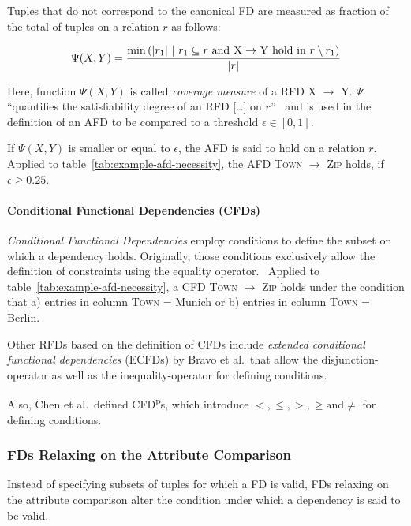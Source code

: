 Tuples that do not correspond to the canonical FD are measured as fraction of the total of tuples on a relation \( r \) as follows:

\begin{align}
    \Psi(X, Y) = \frac{\min{\left(|r_1|~|~r_1 \subseteq r \text{ and } \textsc{X} \rightarrow \textsc{Y} \text{ hold in } r \setminus r_1 \right)}}{|r|}
\end{align}

Here, function \( \Psi(X, Y) \) is called \emph{coverage measure} of a RFD \textsc{X} \( \to \) \textsc{Y}.
\( \Psi \) ``quantifies the satisfiability degree of an RFD [\dots] on \( r \)''~\cite[p.~150]{CAR16} and is used in the definition of an AFD to be compared to a threshold \( \epsilon \in [0, 1] \).

If \( \Psi(X, Y) \) is smaller or equal to \( \epsilon \), the AFD is said to hold on a relation \( r \).
Applied to table~\ref{tab:example-afd-necessity}, the AFD \textsc{Town} \( \to \) \textsc{Zip} holds, if \( \epsilon \geq 0.25\).

\paragraph{Conditional Functional Dependencies (CFDs)}
\emph{Conditional Functional Dependencies} employ conditions to define the subset on which a dependency holds.
Originally, those conditions exclusively allow the definition of constraints using the equality operator.~\cite[p.~152]{CAR16}
Applied to table~\ref{tab:example-afd-necessity}, a CFD \textsc{Town} \( \to\) \textsc{Zip} holds under the condition that a) entries in column \textsc{Town} = Munich or b) entries in column \textsc{Town} = Berlin.

Other RFDs based on the definition of CFDs include \emph{extended conditional functional dependencies} (ECFDs) by Bravo et al.\ that allow the disjunction-operator as well as the inequality-operator for defining conditions.~\cite{BRA08}

Also, Chen et al.\ defined CFD\textsuperscript{p}s, which introduce \( <, \leq, >, \geq \text{and} \neq \) for defining conditions.~\cite{CHE09}

\subsubsection{FDs Relaxing on the Attribute Comparison}
Instead of specifying subsets of tuples for which a FD is valid, FDs relaxing on the attribute comparison alter the condition under which a dependency is said to be valid.

